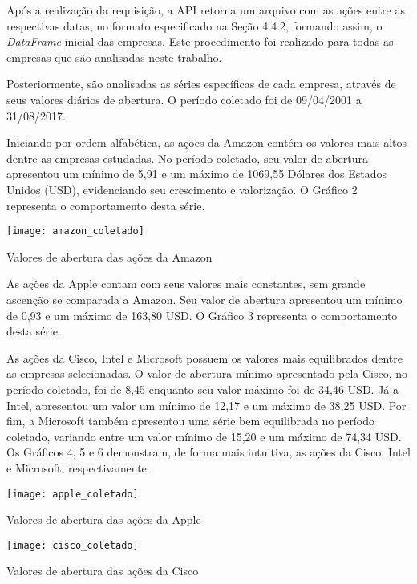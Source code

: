 Após a realização da requisição, a API retorna um arquivo com as ações entre as respectivas datas, no formato especificado na Seção 4.4.2, formando assim, o \textit{DataFrame} inicial das empresas. Este procedimento foi realizado para todas as empresas que são analisadas neste trabalho.

Posteriormente, são analisadas as séries específicas de cada empresa, através de seus valores diários de abertura. O período coletado foi de 09/04/2001 a 31/08/2017.

Iniciando por ordem alfabética, as ações da Amazon contém os valores mais altos dentre as empresas estudadas. No período coletado, seu valor de abertura apresentou um mínimo de 5,91 e um máximo de 1069,55 Dólares dos Estados Unidos (USD), evidenciando seu crescimento e valorização. O Gráfico 2 representa o comportamento desta série.
\begin{grafico}[h]
	\centering
	\centerline{\texttt{[image: amazon\_coletado]}}
	\caption{Valores de abertura das ações da Amazon}
	\label{exec-amazon-coleta}
\end{grafico}

As ações da Apple contam com seus valores mais constantes, sem grande ascenção se comparada a Amazon. Seu valor de abertura apresentou um mínimo de 0,93 e um máximo de 163,80 USD. O Gráfico 3 representa o comportamento desta série.

As ações da Cisco, Intel e Microsoft possuem os valores mais equilibrados dentre as empresas selecionadas. O valor de abertura mínimo apresentado pela Cisco, no período coletado, foi de 8,45 enquanto seu valor máximo foi de 34,46 USD. Já a Intel, apresentou um valor um mínimo de 12,17 e um máximo de 38,25 USD. Por fim, a Microsoft também apresentou uma série bem equilibrada no período coletado, variando entre um valor mínimo de 15,20 e um máximo de 74,34 USD. Os Gráficos 4, 5 e 6 demonstram, de forma mais intuitiva, as ações da Cisco, Intel e Microsoft, respectivamente. 	
\begin{grafico}[h]
	\centering
	\centerline{\texttt{[image: apple\_coletado]}}
	\caption{Valores de abertura das ações da Apple}
	\label{exec-apple-coleta}
\end{grafico}

\begin{grafico}[h]
	\centering
	\centerline{\texttt{[image: cisco\_coletado]}}
	\caption{Valores de abertura das ações da Cisco}
	\label{exec-cisco-coleta}
\end{grafico}
 
